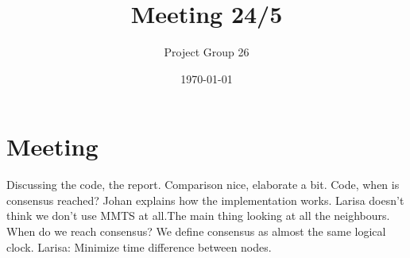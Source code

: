 \documentclass{article}
\title{Meeting 24/5}
\author{Project Group 26}
\date{\today}
\begin{document}
\maketitle

\section{Meeting}

Discussing the code, the report. Comparison nice, elaborate a bit. Code, when is consensus reached? Johan explains how the implementation works. Larisa doesn't think we don't use MMTS at all.The main thing looking at all the neighbours. When do we reach consensus? We define consensus as almost the same logical clock. Larisa: Minimize time difference between nodes.
\end{document}
